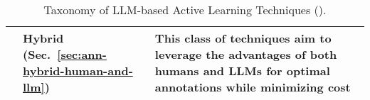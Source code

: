 \begin{table*}[t!]
\begin{tabularx}{1.0\linewidth}{
>{\centering\arraybackslash}m{18mm} 
>{\RaggedLeft\arraybackslash}m{44mm} 
X
}
& Hybrid (Sec.~\ref{sec:ann-hybrid-human-and-llm}) &  
This class of techniques aim to leverage the advantages of both humans and LLMs for optimal annotations while minimizing cost 
\\



\bottomrule
\end{tabularx}
\caption{Taxonomy of LLM-based Active Learning Techniques ().
}
\label{tab:taxonomy-techniques}
\vspace{-3mm}
\end{table*}
